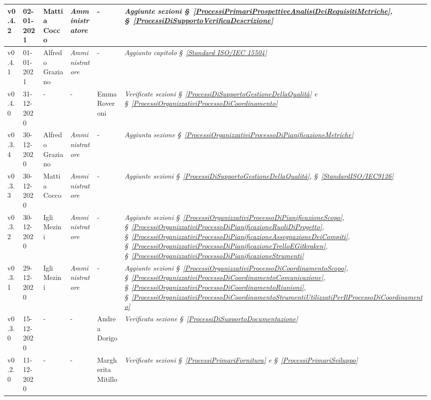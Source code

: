 {\begin{center}
\begin{longtable}[c]{|p{2cm-1\tabcolsep}|p{2cm}|p{3cm-2\tabcolsep}|p{3cm-1.5\tabcolsep}|p{}|p{4cm-2\tabcolsep}|}
		\hline
		\centering v0.4.2 & 02-01-2021 & Mattia Cocco & \centering \textit{Amministratore} & \centering - & \textit{Aggiunte sezioni \S~\ref{ProcessiPrimariProspettiveAnalisiDeiRequisitiMetriche}, \S~\ref{ProcessiDiSupportoVerificaDescrizione}} \\
		\hline
		\centering v0.4.1 & 01-01-2021 & Alfredo Graziano & \centering \textit{Amministratore} & \centering - & \textit{Aggiunto capitolo \S~\ref{Standard ISO/IEC 15504}} \\
		\hline
		\centering v0.4.0 & 31-12-2020 & \centering - & \centering - & Emma Roveroni & \textit{Verificate sezioni \S~\ref{ProcessiDiSupportoGestioneDellaQualità} e \S~\ref{ProcessiOrganizzativiProcessoDiCoordinamento} }  \\
		\hline
		\centering v0.3.4 & 30-12-2020 & Alfredo Graziano & \centering \textit{Amministratore} & \centering - & \textit{Aggiunta sezione \S~\ref{ProcessiOrganizzativiProcessoDiPianificazioneMetriche}} \\
		\hline
		\centering v0.3.3 & 30-12-2020 & Mattia Cocco & \centering \textit{Amministratore} & \centering - & \textit{Aggiunte sezioni \S~\ref{ProcessiDiSupportoGestioneDellaQualità}, \S~\ref{StandardISO/IEC9126} } \\
		\hline
		\centering v0.3.2 & 30-12-2020 & Igli Mezini & \centering \textit{Amministratore} & \centering - & \textit{Aggiunte sezioni \S~\ref{ProcessiOrganizzativiProcessoDiPianificazioneScopo}, \S~\ref{ProcessiOrganizzativiProcessoDiPianificazioneRuoliDiProgetto}, \S~\ref{ProcessiOrganizzativiProcessoDiPianificazioneAssegnazioneDeiCompiti}, \S~\ref{ProcessiOrganizzativiProcessoDiPianificazioneTrelloEGitkraken}, \S~\ref{ProcessiOrganizzativiProcessoDiPianificazioneStrumenti} } \\
		\hline
		\centering v0.3.1 & 29-12-2020 & Igli Mezini & \centering \textit{Amministratore} & \centering - & \textit{Aggiunte sezioni \S~\ref{ProcessiOrganizzativiProcessoDiCoordinamentoScopo}, \S~\ref{ProcessiOrganizzativiProcessoDiCoordinamentoComunicazione}, \S~\ref{ProcessiOrganizzativiProcessoDiCoordinamentoRiunioni}, \S~\ref{ProcessiOrganizzativiProcessoDiCoordinamentoStrumentiUtilizzatiPerIlProcessoDiCoordinamento} } \\
		\hline
		\centering v0.3.0 & 15-12-2020 & \centering - & \centering - & Andrea Dorigo & 
		\textit{Verificata sezione \S~\ref{ProcessiDiSupportoDocumentazione}} \\
		\hline
		\centering v0.2.0 & 11-12-2020 & \centering - & \centering - & Margherita Mitillo & \textit{Verificate sezioni \S~\ref{ProcessiPrimariFornitura} e \S~\ref{ProcessiPrimariSviluppo} } \\

\end{longtable}
\end{center}}
